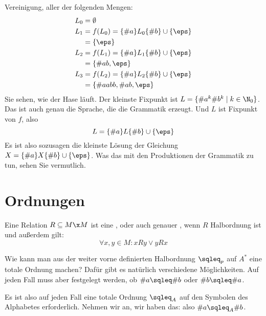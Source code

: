 Vereinigung, aller der folgenden Mengen:
\begin{align*}
  L_0 &= \emptyset\\
  L_1 &= f(L_0) = \{\#a\}L_0\{\#b\}\cup\{\eps\} \\
  &= \{\eps\} \\
  L_2 &= f(L_1) = \{\#a\}L_1\{\#b\}\cup\{\eps\} \\
  &= \{\#{ab},\eps\} \\
  L_3 &= f(L_2) = \{\#a\}L_2\{\#b\}\cup\{\eps\} \\
  &= \{\#{aabb},\#{ab},\eps\} \\
\end{align*}
%
Sie sehen, wie der Hase läuft. Der kleinste Fixpunkt ist
$L=\{\#a^k\#b^k\mid k\in \N_0\}$. Das ist auch genau die Sprache, die
die Grammatik erzeugt. Und  $L$ ist Fixpunkt von $f$, also
\[
L = \{\#a\}L\{\#b\}\cup\{\eps\}
\]
Es ist also sozusagen die kleinste Lösung der Gleichung $X =
\{\#a\}X\{\#b\}\cup\{\eps\}$. Was das mit den Produktionen der
Grammatik zu tun, sehen Sie vermutlich.



\Tut\section{Ordnungen}
\label{sub:ord-rel}

Eine Relation $R\subseteq M\x M$ ist eine
, oder auch genauer , wenn $R$
Halbordnung ist und außerdem  gilt:
\[
\forall x,y\in M: x R y \lor y R x
\]

Wie kann man aus der weiter vorne definierten Halbordnung $\sqleq_p$
auf $A^*$ eine totale Ordnung machen?  Dafür gibt es natürlich
verschiedene Möglichkeiten. Auf jeden Fall muss aber \zB festgelegt
werden, ob $\#a\sqleq\#b$ oder $\#b\sqleq \#a$.

Es ist also auf jeden Fall eine totale Ordnung $\sqleq_A$ auf den
Symbolen des Alphabetes erforderlich. Nehmen wir an, wir haben das:
also \zB $\#a \sqleq_A \#b$.

